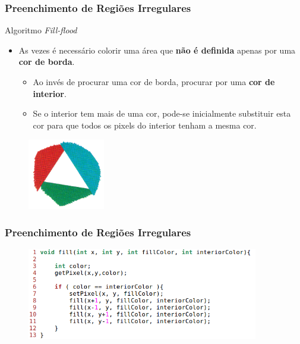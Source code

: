 \documentclass{beamer}
\begin{document}
\begin{frame}
\frametitle{Preenchimento de Regiões Irregulares}

	\begin{block}{Algoritmo \textit{Fill-flood}}
		\begin{itemize}
			\item As vezes é necessário colorir uma área que \textbf{não é definida} apenas por uma \textbf{cor de borda}.
				\begin{itemize}
					\item Ao invés de procurar uma cor de borda, procurar por uma \textbf{cor de interior}.
					\item Se o interior tem mais de uma cor, pode-se inicialmente substituir esta cor para que todos os pixels do interior tenham a mesma cor.
				\end{itemize}
		\end{itemize}
	\end{block}
	
	\begin{figure}[!h]
			\begin{center}
				\includegraphics[width=0.3\textwidth]{Figures/FilFlo}
			\end{center}
	\end{figure}
\end{frame}

\begin{frame}
\frametitle{Preenchimento de Regiões Irregulares}

	\begin{figure}[!h]
			\begin{flushleft}
				\includegraphics[width=0.9\textwidth]{Figures/FilFloAlg}
			\end{flushleft}
	\end{figure}
\end{frame}
\end{document}
